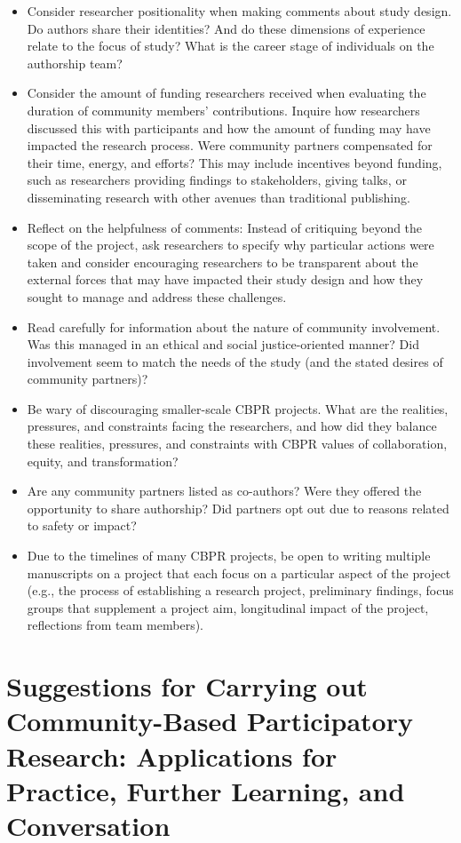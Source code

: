 \documentclass[
  11pt,
]{book}
\providecommand{\tightlist}{%
  \setlength{\itemsep}{0pt}\setlength{\parskip}{0pt}}
\begin{document}
\begin{itemize}
\tightlist
\item
  Consider researcher positionality when making comments about study design. Do authors share their identities? And do these dimensions of experience relate to the focus of study? What is the career stage of individuals on the authorship team?
\item
  Consider the amount of funding researchers received when evaluating the duration of community members' contributions. Inquire how researchers discussed this with participants and how the amount of funding may have impacted the research process. Were community partners compensated for their time, energy, and efforts? This may include incentives beyond funding, such as researchers providing findings to stakeholders, giving talks, or disseminating research with other avenues than traditional publishing.
\item
  Reflect on the helpfulness of comments: Instead of critiquing beyond the scope of the project, ask researchers to specify why particular actions were taken and consider encouraging researchers to be transparent about the external forces that may have impacted their study design and how they sought to manage and address these challenges.
\item
  Read carefully for information about the nature of community involvement. Was this managed in an ethical and social justice-oriented manner? Did involvement seem to match the needs of the study (and the stated desires of community partners)?
\item
  Be wary of discouraging smaller-scale CBPR projects. What are the realities, pressures, and constraints facing the researchers, and how did they balance these realities, pressures, and constraints with CBPR values of collaboration, equity, and transformation?
\item
  Are any community partners listed as co-authors? Were they offered the opportunity to share authorship? Did partners opt out due to reasons related to safety or impact?
\item
  Due to the timelines of many CBPR projects, be open to writing multiple manuscripts on a project that each focus on a particular aspect of the project (e.g., the process of establishing a research project, preliminary findings, focus groups that supplement a project aim, longitudinal impact of the project, reflections from team members).
\end{itemize}

\hypertarget{suggestions-for-carrying-out-community-based-participatory-research-applications-for-practice-further-learning-and-conversation}{%
\section{Suggestions for Carrying out Community-Based Participatory Research: Applications for Practice, Further Learning, and Conversation}\label{suggestions-for-carrying-out-community-based-participatory-research-applications-for-practice-further-learning-and-conversation}}
\end{document}
